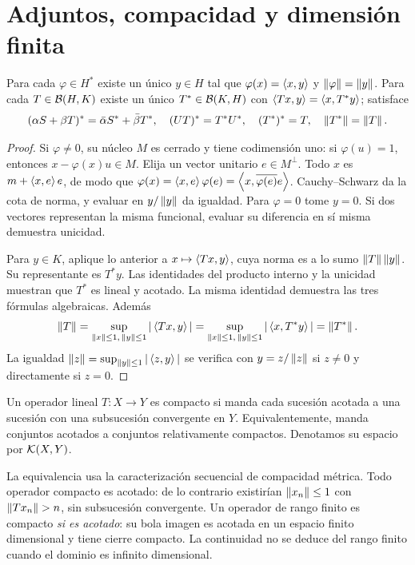 \section{Adjuntos, compacidad y dimensión finita}
\begin{teorema}\label{v3:riesz-adjunto}
Para cada $\varphi\in H^*$ existe un único $y\in H$ tal que $\varphi(x)=\left\langle x,y\right\rangle$ y $\left\lVert\varphi\right\rVert=\left\lVert y\right\rVert$. Para cada $T\in\mathcal B(H,K)$ existe un único $T^*\in\mathcal B(K,H)$ con $\left\langle Tx,y\right\rangle=\left\langle x,T^*y\right\rangle$; satisface
\[
 (\alpha S+\beta T)^*=\bar\alpha S^*+\bar\beta T^*,\quad
 (UT)^*=T^*U^*,\quad (T^*)^*=T,\quad\left\lVert T^*\right\rVert=\left\lVert T\right\rVert.
\]
\end{teorema}
\begin{proof}
Si $\varphi\ne0$, su núcleo $M$ es cerrado y tiene codimensión uno: si $\varphi(u)=1$, entonces $x-\varphi(x)u\in M$. Elija un vector unitario $e\in M^\perp$. Todo $x$ es $m+\left\langle x,e\right\rangle e$, de modo que $\varphi(x)=\left\langle x,e\right\rangle\varphi(e)=\left\langle x,\overline{\varphi(e)}e\right\rangle$. Cauchy--Schwarz da la cota de norma, y evaluar en $y/\left\lVert y\right\rVert$ da igualdad. Para $\varphi=0$ tome $y=0$. Si dos vectores representan la misma funcional, evaluar su diferencia en sí misma demuestra unicidad.

Para $y\in K$, aplique lo anterior a $x\mapsto\left\langle Tx,y\right\rangle$, cuya norma es a lo sumo $\left\lVert T\right\rVert\left\lVert y\right\rVert$. Su representante es $T^*y$. Las identidades del producto interno y la unicidad muestran que $T^*$ es lineal y acotado. La misma identidad demuestra las tres fórmulas algebraicas. Además
\[
 \left\lVert T\right\rVert=\sup_{\left\lVert x\right\rVert\leq1,\,\left\lVert y\right\rVert\leq1}|\left\langle Tx,y\right\rangle|
 =\sup_{\left\lVert x\right\rVert\leq1,\,\left\lVert y\right\rVert\leq1}|\left\langle x,T^*y\right\rangle|=\left\lVert T^*\right\rVert.
\]
La igualdad $\left\lVert z\right\rVert=\sup_{\left\lVert y\right\rVert\leq1}|\left\langle z,y\right\rangle|$ se verifica con $y=z/\left\lVert z\right\rVert$ si $z\ne0$ y directamente si $z=0$.
\end{proof}

\begin{definicion}
Un operador lineal $T:X\to Y$ es compacto si manda cada sucesión acotada a una sucesión con una subsucesión convergente en $Y$. Equivalentemente, manda conjuntos acotados a conjuntos relativamente compactos. Denotamos su espacio por $\mathcal K(X,Y)$.
\end{definicion}
La equivalencia usa la caracterización secuencial de compacidad métrica. Todo operador compacto es acotado: de lo contrario existirían $\left\lVert x_n\right\rVert\leq1$ con $\left\lVert Tx_n\right\rVert>n$, sin subsucesión convergente. Un operador de rango finito es compacto \emph{si es acotado}: su bola imagen es acotada en un espacio finito dimensional y tiene cierre compacto. La continuidad no se deduce del rango finito cuando el dominio es infinito dimensional.

